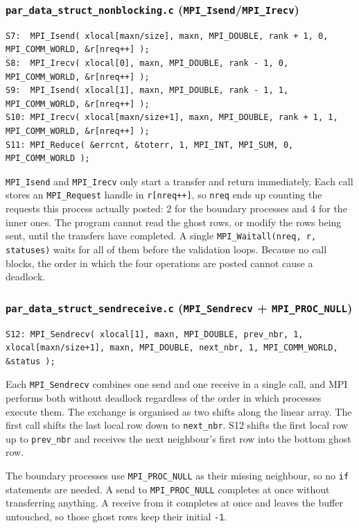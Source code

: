 \documentclass[11pt,a4paper]{article}
\begin{document}
\subsubsection*{\texttt{par\_data\_struct\_nonblocking.c} (\texttt{MPI\_Isend}/\texttt{MPI\_Irecv})}
\begin{lstlisting}
S7:  MPI_Isend( xlocal[maxn/size], maxn, MPI_DOUBLE, rank + 1, 0, MPI_COMM_WORLD, &r[nreq++] );
S8:  MPI_Irecv( xlocal[0], maxn, MPI_DOUBLE, rank - 1, 0, MPI_COMM_WORLD, &r[nreq++] );
S9:  MPI_Isend( xlocal[1], maxn, MPI_DOUBLE, rank - 1, 1, MPI_COMM_WORLD, &r[nreq++] );
S10: MPI_Irecv( xlocal[maxn/size+1], maxn, MPI_DOUBLE, rank + 1, 1, MPI_COMM_WORLD, &r[nreq++] );
S11: MPI_Reduce( &errcnt, &toterr, 1, MPI_INT, MPI_SUM, 0, MPI_COMM_WORLD );
\end{lstlisting}
\texttt{MPI\_Isend} and \texttt{MPI\_Irecv} only start a transfer and return immediately. Each call stores an \texttt{MPI\_Request} handle in \texttt{r[nreq++]}, so \texttt{nreq} ends up counting the requests this process actually posted: 2 for the boundary processes and 4 for the inner ones. The program cannot read the ghost rows, or modify the rows being sent, until the transfers have completed. A single \texttt{MPI\_Waitall(nreq, r, statuses)} waits for all of them before the validation loops. Because no call blocks, the order in which the four operations are posted cannot cause a deadlock.

\subsubsection*{\texttt{par\_data\_struct\_sendreceive.c} (\texttt{MPI\_Sendrecv} + \texttt{MPI\_PROC\_NULL})}
\begin{lstlisting}
S12: MPI_Sendrecv( xlocal[1], maxn, MPI_DOUBLE, prev_nbr, 1, xlocal[maxn/size+1], maxn, MPI_DOUBLE, next_nbr, 1, MPI_COMM_WORLD, &status );
\end{lstlisting}
Each \texttt{MPI\_Sendrecv} combines one send and one receive in a single call, and MPI performs both without deadlock regardless of the order in which processes execute them. The exchange is organised as two shifts along the linear array. The first call shifts the last local row down to \texttt{next\_nbr}. S12 shifts the first local row up to \texttt{prev\_nbr} and receives the next neighbour's first row into the bottom ghost row.

The boundary processes use \texttt{MPI\_PROC\_NULL} as their missing neighbour, so no \texttt{if} statements are needed. A send to \texttt{MPI\_PROC\_NULL} completes at once without transferring anything. A receive from it completes at once and leaves the buffer untouched, so those ghost rows keep their initial \texttt{-1}.
\end{document}
